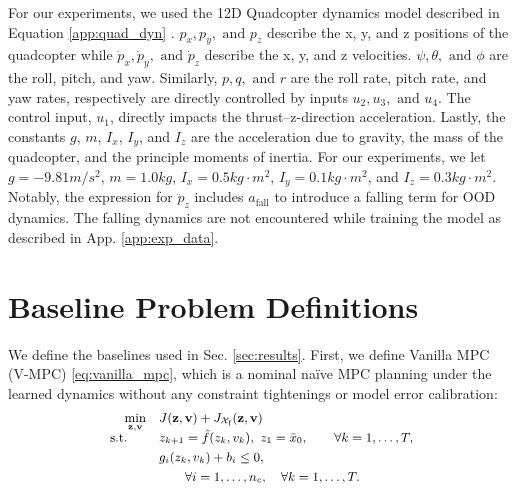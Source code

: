 \documentclass{l4dc2026}
\newcommand{\Z}{\mathbf{z}}
\newcommand{\V}{\mathbf{v}}
\begin{document}
For our experiments, we used the 12D Quadcopter dynamics model described in Equation \ref{app:quad_dyn} \citep{sabatino2015quadrotor}. $p_x, p_y, \text{ and } p_z$ describe the x, y, and z positions of the quadcopter while $\dot p_x, \dot p_y, \text{ and } \dot p_z$ describe the x, y, and z velocities. ${\psi}, {\theta}, \text{ and } {\phi}$ are the roll, pitch, and yaw. Similarly, $p, q, \text{ and } r$ are the roll rate, pitch rate, and yaw rates, respectively are directly controlled by inputs $u_2, u_3, \text{ and } u_4$. The control input, $u_1$, directly impacts the thrust--z-direction acceleration. Lastly, the constants $g$, $m$, $I_x$, $I_y$, and $I_z$ are the acceleration due to gravity, the mass of the quadcopter, and the principle moments of inertia. For our experiments, we let $g=-9.81 m/s^{2}$, $m = 1.0 kg$, $I_x = 0.5 kg\cdot m^2$, $I_y = 0.1 kg\cdot m^2$, and $I_z = 0.3 kg\cdot m^2$. Notably, the expression for $\ddot{p}_z$ includes $a_\text{fall}$ to introduce a falling term for OOD dynamics. The falling dynamics are not encountered while training the model as described in App. \ref{app:exp_data}. 

\section{Baseline Problem Definitions}\label{app:probs}

We define the baselines used in Sec. \ref{sec:results}. First, we define Vanilla MPC (V-MPC) \eqref{eq:vanilla_mpc}, which is a nominal na\"ive MPC planning under the learned dynamics without any constraint tightenings or model error calibration:
\begin{subequations}\small
\label{eq:vanilla_mpc}
\begin{align}
\min_{\substack{\mathbf{z}, \mathbf{v}}}\quad &  J(\mathbf{z},\mathbf{v}) + J_{\mathcal{X}_\textrm{f}}(\Z,\V)\\[-6pt]
\text { s.t. }\quad\quad &  {z}_{k+1}= \hat{f}(z_k,v_k),~ {z}_1 = \bar x_0,\quad\quad \forall k = 1,\ldots, T,\\
&g_{i}(z_k,v_k) + b_{i}  \leq 0,\\
&  \quad\quad \forall i =1, \ldots, n_c,\quad \forall k= 1,\ldots,T. \nonumber
\end{align}
\end{subequations}
\end{document}
